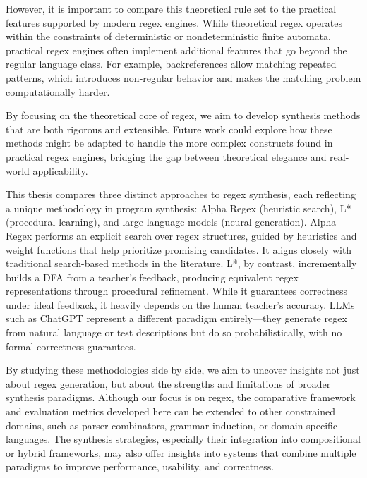 \indent\indent However, it is important to compare this theoretical rule set to the practical features supported by modern regex engines. While theoretical regex operates within the constraints of deterministic or nondeterministic finite automata, practical regex engines often implement additional features that go beyond the regular language class. For example, backreferences allow matching repeated patterns, which introduces non-regular behavior and makes the matching problem computationally harder.

\indent\indent By focusing on the theoretical core of regex, we aim to develop synthesis methods that are both rigorous and extensible. Future work could explore how these methods might be adapted to handle the more complex constructs found in practical regex engines, bridging the gap between theoretical elegance and real-world applicability.

\indent\indent This thesis compares three distinct approaches to regex synthesis, each reflecting a unique methodology in program synthesis: Alpha Regex (heuristic search), L* (procedural learning), and large language models (neural generation). Alpha Regex performs an explicit search over regex structures, guided by heuristics and weight functions that help prioritize promising candidates. It aligns closely with traditional search-based methods in the literature. L*, by contrast, incrementally builds a DFA from a teacher's feedback, producing equivalent regex representations through procedural refinement. While it guarantees correctness under ideal feedback, it heavily depends on the human teacher's accuracy. LLMs such as ChatGPT represent a different paradigm entirely—they generate regex from natural language or test descriptions but do so probabilistically, with no formal correctness guarantees.

\indent\indent By studying these methodologies side by side, we aim to uncover insights not just about regex generation, but about the strengths and limitations of broader synthesis paradigms. Although our focus is on regex, the comparative framework and evaluation metrics developed here can be extended to other constrained domains, such as parser combinators, grammar induction, or domain-specific languages. The synthesis strategies, especially their integration into compositional or hybrid frameworks, may also offer insights into systems that combine multiple paradigms to improve performance, usability, and correctness.

\vspace{-0.4em}
